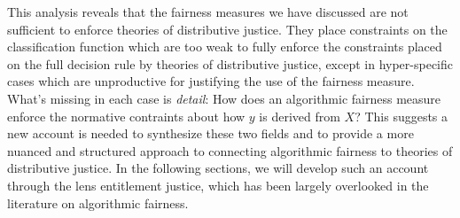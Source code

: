 This analysis reveals that the fairness measures we have discussed are not
sufficient to enforce theories of distributive justice. They place constraints
on the classification function which are too weak to fully enforce the
constraints placed on the full decision rule by theories of distributive
justice, except in hyper-specific cases which are unproductive for justifying 
the use of the fairness measure. What's missing in each case is \textit{detail}:
How does an algorithmic fairness measure enforce the normative contraints about
how $y$ is derived from $X$? This suggests a new account is needed to synthesize
these two fields and to provide a more nuanced and structured approach to
connecting algorithmic fairness to theories of distributive justice. In the
following sections, we will develop such an account through the lens entitlement
justice, which has been largely overlooked in the literature on algorithmic
fairness.

